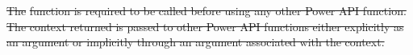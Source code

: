 \documentclass[12pt]{report} %
\providecommand{\DIFdeltex}[1]{{\protect\color{red}\sout{#1}}}                      %
\providecommand{\DIFdelbegin}{} %
\providecommand{\DIFdel}[1]{\texorpdfstring{\DIFdeltex{#1}}{}} %
\newcommand{\DIFscaledelfig}{0.5}
\newlength{\DIFdelgraphicswidth} %
\newlength{\DIFdelgraphicsheight} %
\newcommand{\DIFdelincludegraphics}[2][]{%
\sbox{\DIFdelgraphicsbox}{\DIFOincludegraphics[#1]{#2}}%
\settoboxwidth{\DIFdelgraphicswidth}{\DIFdelgraphicsbox} %
\settoboxtotalheight{\DIFdelgraphicsheight}{\DIFdelgraphicsbox} %
\scalebox{\DIFscaledelfig}{%
\parbox[b]{\DIFdelgraphicswidth}{\usebox{\DIFdelgraphicsbox}\\[-\baselineskip] \rule{\DIFdelgraphicswidth}{0em}}\llap{\resizebox{\DIFdelgraphicswidth}{\DIFdelgraphicsheight}{%
\setlength{\unitlength}{\DIFdelgraphicswidth}%
\begin{picture}(1,1)%
\thicklines\linethickness{2pt} %
{\color[rgb]{1,0,0}\put(0,0){\framebox(1,1){}}}%
{\color[rgb]{1,0,0}\put(0,0){\line( 1,1){1}}}%
{\color[rgb]{1,0,0}\put(0,1){\line(1,-1){1}}}%
\end{picture}%
}\hspace*{3pt}}} %
} %
\DeclareRobustCommand{\DIFdelbegin}{\DIFOdelbegin \let\includegraphics\DIFdelincludegraphics} %
\begin{document}
\DIFdelbegin %

\DIFdel{The }%
\DIFdel{function is required to be called before using any other Power API function.
The context returned is passed to other Power API functions either explicitly as an argument or implicitly through an argument associated with the context.
}%

\end{document}
